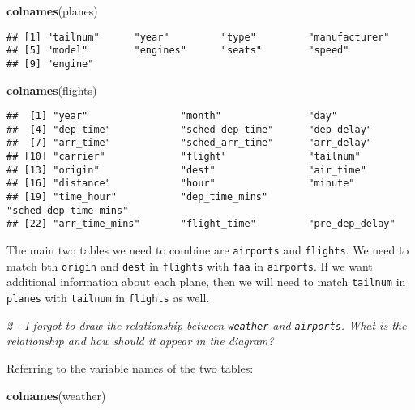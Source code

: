 \documentclass[]{article}
\newenvironment{Shaded}{\begin{snugshade}}{\end{snugshade}}
\newcommand{\KeywordTok}[1]{\textcolor[rgb]{0.13,0.29,0.53}{\textbf{#1}}}
\newcommand{\NormalTok}[1]{#1}
\theoremstyle{definition}
\theoremstyle{definition}
\theoremstyle{definition}
\theoremstyle{remark}
\begin{document}
\begin{Shaded}
\begin{Highlighting}[]
\KeywordTok{colnames}\NormalTok{(planes)}
\end{Highlighting}
\end{Shaded}

\begin{verbatim}
## [1] "tailnum"      "year"         "type"         "manufacturer"
## [5] "model"        "engines"      "seats"        "speed"       
## [9] "engine"
\end{verbatim}

\begin{Shaded}
\begin{Highlighting}[]
\KeywordTok{colnames}\NormalTok{(flights)}
\end{Highlighting}
\end{Shaded}

\begin{verbatim}
##  [1] "year"                "month"               "day"                
##  [4] "dep_time"            "sched_dep_time"      "dep_delay"          
##  [7] "arr_time"            "sched_arr_time"      "arr_delay"          
## [10] "carrier"             "flight"              "tailnum"            
## [13] "origin"              "dest"                "air_time"           
## [16] "distance"            "hour"                "minute"             
## [19] "time_hour"           "dep_time_mins"       "sched_dep_time_mins"
## [22] "arr_time_mins"       "flight_time"         "pre_dep_delay"
\end{verbatim}

The main two tables we need to combine are \texttt{airports} and
\texttt{flights}. We need to match bth \texttt{origin} and \texttt{dest}
in \texttt{flights} with \texttt{faa} in \texttt{airports}. If we want
additional information about each plane, then we will need to match
\texttt{tailnum} in \texttt{planes} with \texttt{tailnum} in
\texttt{flights} as well.

\emph{2 - I forgot to draw the relationship between \texttt{weather} and
\texttt{airports}. What is the relationship and how should it appear in
the diagram?}

Referring to the variable names of the two tables:

\begin{Shaded}
\begin{Highlighting}[]
\KeywordTok{colnames}\NormalTok{(weather)}
\end{Highlighting}
\end{Shaded}
\end{document}
